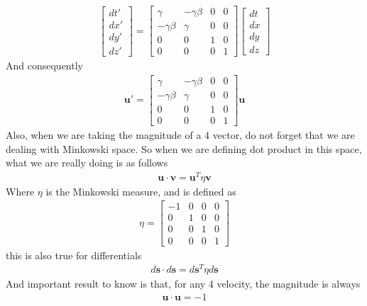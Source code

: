 \documentclass[12pt]{book}
\begin{document}
\begin{align}
\begin{bmatrix}
dt' \\
dx' \\
dy' \\
dz'
\end{bmatrix}
=
\begin{bmatrix}
\gamma & -\gamma\beta & 0 & 0 \\
-\gamma\beta & \gamma & 0 & 0 \\
0 & 0 & 1 & 0 \\
0 & 0 & 0 & 1
\end{bmatrix}
\begin{bmatrix}
dt \\
dx \\
dy \\
dz
\end{bmatrix}
\end{align}
And consequently
\begin{align}
\mathbf{u}' = \begin{bmatrix}
\gamma & -\gamma\beta & 0 & 0 \\
-\gamma\beta & \gamma & 0 & 0 \\
0 & 0 & 1 & 0 \\
0 & 0 & 0 & 1
\end{bmatrix}\mathbf{u}
\end{align}
Also, when we are taking the magnitude of a 4 vector, do not forget that we are dealing with Minkowski space. So when we are defining dot product in this space, what we are really doing is as follows
\begin{align}
\mathbf{u}\cdot \mathbf{v} = \mathbf{u}^T\eta\mathbf{v}
\end{align}
Where $\eta$ is the Minkowski measure, and is defined as
\begin{align}
\eta = \begin{bmatrix}
    -1&0&0&0\\
    0&1&0&0\\
    0&0&1&0\\
    0&0&0&1
\end{bmatrix}
\end{align}
this is also true for differentials
\begin{align}
d\mathbf{s}\cdot d\mathbf{s} = d\mathbf{s}^T\eta d\mathbf{s}
\end{align}
And important result to know is that, for any 4 velocity, the magnitude is always
\begin{align}
\mathbf{u}\cdot \mathbf{u} = -1
\end{align}
\end{document}
